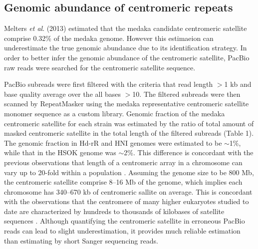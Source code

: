 \subsection*{Genomic abundance of centromeric repeats}
Melters \textit{et al}. (2013) estimated that the medaka candidate centromeric satellite comprise 0.32\% of the medaka genome. However this estimaeion can underestimate the true genomic abundance due to its identification strategy. In order to better infer the genomic abundance of the centromeric satellite, PacBio raw reads were searched for the centromeric satellite sequence.

PacBio subreads were first filtered with the criteria that read length $>$1 kb and base quality average over the all bases $>$10. The filtered subreads were then scanned by RepeatMasker using the medaka representative centromeric satellite monomer sequence as a custom library. Genomic fraction of the medaka centromeric satellite for each strain was estimated by the ratio of total amount of masked centromeric satellite in the total length of the filtered subreads (Table 1). The genomic fraction in Hd-rR and HNI genomes were estimated to be $\sim$1\%, while that in the HSOK genome was $\sim$2\%. This difference is concordant with the previous observations that length of a centromeric array in a chromosome can vary up to 20-fold within a population \cite{Miga}. Assuming the genome size to be 800 Mb, the centromeric satellite comprise 8--16 Mb of the genome, which implies each chromosome has 340--670 kb of centromeric sallite on average. This is concordant with the observations that the centromere of many higher eukaryotes studied to date are characterized by hundreds to thousands of kilobases of satellite sequences \cite{Plohl}. Although quantifying the centromeric satellite in erroneous PacBio reads can lead to slight underestimation, it provides much reliable estimation than estimating by short Sanger sequencing reads.

\subsection*{}
